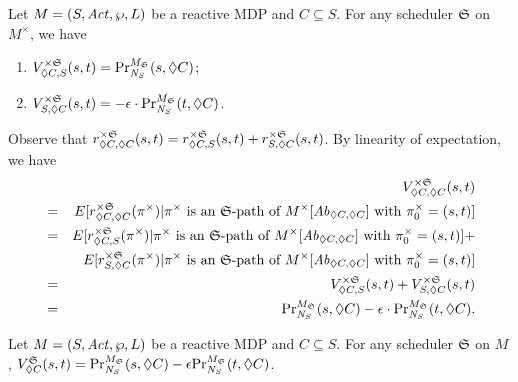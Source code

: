 \begin{proposition}
  Let $M = (S, \Act, \wp, L)$ be a reactive MDP and $C \subseteq S$.
  For any scheduler $\scheduler{S}$ on $M^{\times}$, we have
  \begin{enumerate}
  \item ${V}_{\gF C, S}^{\times\scheduler{S}} (s, t) = 
    \myPr{s}{M_{\scheduler{S}}}{\neighbor{S}}{\gF C}$;
  \item ${V}_{S, \gF C}^{\times\scheduler{S}} (s, t) =  
    -\epsilon \cdot \myPr{t}{M_{\scheduler{S}}}{\neighbor{S}}{\gF C}$.
  \end{enumerate}
  \label{proposition:individual-probability-nextC}
\end{proposition}

Observe that ${r}_{\gF C, \gF C}^{\times \scheduler{S}} (s, t) =
{r}_{\gF C, S}^{\times \scheduler{S}} (s, t) + {r}_{S, \gF C}^{\times
  \scheduler{S}} (s, t)$. By linearity of expectation, we have
\begin{eqnarray*}
  & & {V}_{\gF C, \gF C}^{\times \scheduler{S}} (s, t)\\
  &=& E[ {r}_{\gF C, \gF C}^{\times \scheduler{S}} (\pi^{\times}) |
      \pi^{\times} \textmd{ is an $\scheduler{S}$-path of }
      M^{\times}[\mathit{Ab}_{\gF C, \gF C}] \textmd{ with }
      \pi_0^{\times} = (s, t) ]\\
  &=&  E[ {r}_{\gF C, S}^{\times \scheduler{S}} (\pi^{\times}) |
      \pi^{\times} \textmd{ is an $\scheduler{S}$-path of }
      M^{\times}[\mathit{Ab}_{\gF C, \gF C}] \textmd{ with }
      \pi_0^{\times} = (s, t) ] +\\
  & &  E[ {r}_{S, \gF C}^{\times \scheduler{S}} (\pi^{\times}) |
      \pi^{\times} \textmd{ is an $\scheduler{S}$-path of }
      M^{\times}[\mathit{Ab}_{\gF C, \gF C}] \textmd{ with }
      \pi_0^{\times} = (s, t) ]\\
  &=& {V}_{\gF C, S}^{\times \scheduler{S}} (s, t) +
      {V}_{S, \gF C}^{\times \scheduler{S}} (s, t)\\
  &=& \myPr{s}{M_{\scheduler{S}}}{\neighbor{S}}{\gF C} -
      \epsilon \cdot \myPr{t}{M_{\scheduler{S}}}{\neighbor{S}}{\gF C}.
\end{eqnarray*}


\begin{lemma}
  Let $M = (S, \Act, \wp, L)$ be a reactive MDP and $C \subseteq S$.
  For any scheduler $\scheduler{S}$ on $M$,
  $V^{\scheduler{S}}_{\Diamond C} (s, t) =
  \myPr{s}{M_{\scheduler{S}}}{\neighbor{S}}{\gF C} -
  \epsilon \myPr{t}{M_{\scheduler{S}}}{\neighbor{S}}{\gF C}$.
\label{lemma:eventuallyC}
\end{lemma}

